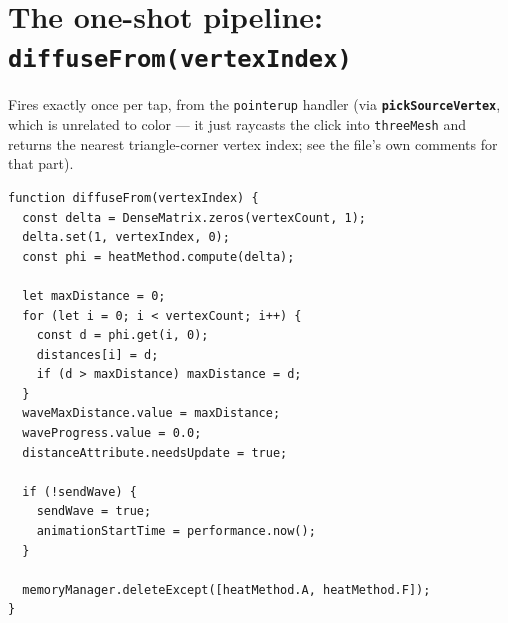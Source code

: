 \documentclass[11pt]{article}
\newcommand{\code}[1]{\texttt{#1}}
\newcommand{\func}[1]{\texttt{\textbf{#1}}}
\begin{document}
\section{The one-shot pipeline: \func{diffuseFrom(vertexIndex)}}
\label{sec:oneshot}

Fires exactly once per tap, from the \code{pointerup} handler (via
\func{pickSourceVertex}, which is unrelated to color --- it just raycasts the click into
\code{threeMesh} and returns the nearest triangle-corner vertex index; see the file's own
comments for that part).

\begin{lstlisting}
function diffuseFrom(vertexIndex) {
  const delta = DenseMatrix.zeros(vertexCount, 1);
  delta.set(1, vertexIndex, 0);
  const phi = heatMethod.compute(delta);

  let maxDistance = 0;
  for (let i = 0; i < vertexCount; i++) {
    const d = phi.get(i, 0);
    distances[i] = d;
    if (d > maxDistance) maxDistance = d;
  }
  waveMaxDistance.value = maxDistance;
  waveProgress.value = 0.0;
  distanceAttribute.needsUpdate = true;

  if (!sendWave) {
    sendWave = true;
    animationStartTime = performance.now();
  }

  memoryManager.deleteExcept([heatMethod.A, heatMethod.F]);
}
\end{lstlisting}
\end{document}
